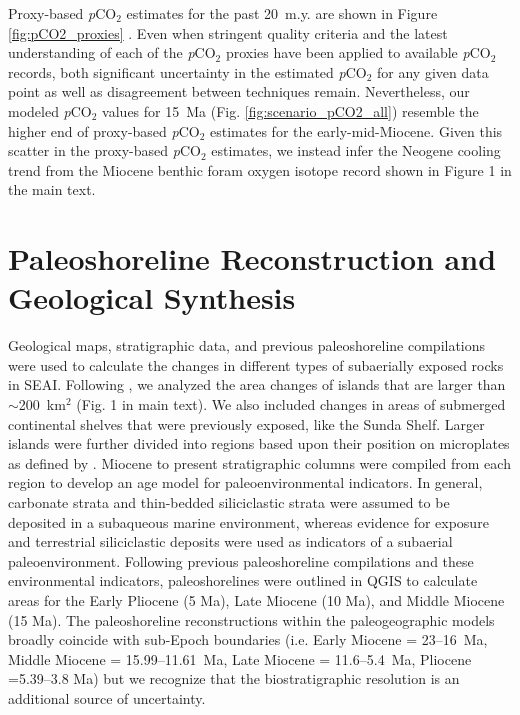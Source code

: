 \documentclass[11pt,letterpaper]{article}
\newcommand{\pCOtwo}{\textit{p}CO$_{2}$\xspace}
\begin{document}
Proxy-based \pCOtwo estimates for the past 20~m.y. are shown in Figure \ref{fig:pCO2_proxies} \citep{Bereiter2015a, Foster2017a, Ji2018a}. Even when stringent quality criteria and the latest understanding of each of the \pCOtwo proxies have been applied to available \pCOtwo records, both significant uncertainty in the estimated \pCOtwo for any given data point as well as disagreement between techniques remain. Nevertheless, our modeled \pCOtwo values for 15~Ma (Fig. \ref{fig:scenario_pCO2_all}) resemble the higher end of proxy-based \pCOtwo estimates for the early-mid-Miocene. Given this scatter in the proxy-based \pCOtwo estimates, we instead infer the Neogene cooling trend from the Miocene benthic foram oxygen isotope record shown in Figure 1 in the main text.

\section*{Paleoshoreline Reconstruction and Geological Synthesis}

Geological maps, stratigraphic data, and previous paleoshoreline compilations were used to calculate the changes in different types of subaerially exposed rocks in SEAI. Following \citet{Molnar2015a}, we analyzed the area changes of islands that are larger than $\sim$200~km$^{2}$ (Fig. 1 in main text). We also included changes in areas of submerged continental shelves that were previously exposed, like the Sunda Shelf. Larger islands were further divided into regions based upon their position on microplates as defined by \citet{Matthews2016a}. Miocene to present stratigraphic columns were compiled from each region to develop an age model for paleoenvironmental indicators. In general, carbonate strata and thin-bedded siliciclastic strata were assumed to be deposited in a subaqueous marine environment, whereas evidence for exposure and terrestrial siliciclastic deposits were used as indicators of a subaerial paleoenvironment. Following previous paleoshoreline compilations and these environmental indicators, paleoshorelines were outlined in QGIS to calculate areas for the Early Pliocene (5 Ma), Late Miocene (10 Ma), and Middle Miocene (15 Ma). The paleoshoreline reconstructions within the paleogeographic models broadly coincide with sub-Epoch boundaries (i.e. Early Miocene = 23--16~Ma, Middle Miocene = 15.99--11.61~Ma, Late Miocene = 11.6--5.4~Ma, Pliocene =5.39--3.8 Ma) but we recognize that the biostratigraphic resolution is an additional source of uncertainty.
\end{document}
